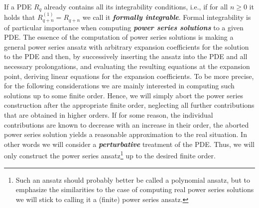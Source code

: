 If a PDE $R_q$ already contains all its integrability conditions, i.e., if for all $n\geq 0$ it holds that $R_{q+n}^{(1)} = R_{q+n}$ we call it \textit{\textbf{formally integrable}}.
Formal integrability is of particular importance when computing \textbf{\textit{power series solutions}} to a given PDE. The essence of the computation of power series solutions is making a general power series ansatz with arbitrary expansion coefficients for the solution to the PDE and then, by successively inserting the ansatz into the PDE and all necessary prolongations, and evaluating the resulting equations at the expansion point, deriving linear equations for the expansion coefficients. 
To be more precise, for the following considerations we are mainly interested in computing such solutions up to some finite order. Hence, we will simply abort the power series construction after the appropriate finite order, neglecting all further contributions that are obtained in higher orders.
If for some reason, the individual contributions are known to decrease with an increase in their order, the aborted power series solution yields a reasonable approximation to the real situation. 
In other words we will consider a \textit{\textbf{perturbative}} treatment of the PDE.
Thus, we will only construct the power series ansatz\footnote{Such an ansatz should probably better be called a polynomial ansatz, but to emphasize the similarities to the case of computing real power series solutions we will stick to calling it a (finite) power series ansatz.} up to the desired finite order.

